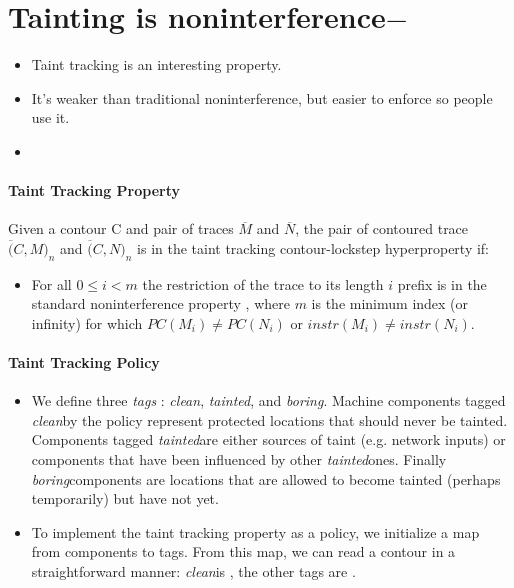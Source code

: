 \documentclass[conference]{IEEEtran}
\begin{document}
\newpage
\section{Tainting is noninterference$-$}

\begin{itemize}
\item Taint tracking is an interesting property.
\item It's weaker than traditional noninterference, but easier to enforce so people use it.
\item {}
\end{itemize}

\paragraph{Taint Tracking Property}

Given a contour C and pair of traces $\overline{M}$ and $\overline{N}$,
the pair of contoured trace $\overline(C, M)_n$ and $\overline(C,N)_n$ is in the
taint tracking contour-lockstep hyperproperty if:
\begin{itemize}
\item For all $0 \leq i < m$ the restriction of the trace to its
  length $i$ prefix is in the standard noninterference property
  , where $m$ is the minimum
  index (or infinity) for which $PC(M_i) \not = PC(N_i)$ or
  $instr(M_i) \not = instr(N_i)$.
\end{itemize}

\paragraph{Taint Tracking Policy}

\newcommand*{\clean}{{\em clean}}
\newcommand*{\tainted}{{\em tainted}}
\newcommand*{\boring}{{\em boring}}
\begin{itemize}
\item We define three {\em tags} : \clean, \tainted, and \boring. Machine components tagged
  \clean by the policy represent protected locations that should never
  be tainted. Components tagged \tainted are either sources of taint
  (e.g. network inputs) or components that have been influenced by
  other \tainted ones. Finally \boring components are locations that
  are allowed to become tainted (perhaps temporarily) but have not
  yet.
\item To implement the taint tracking property as a policy, we
  initialize a map from components to tags. From this map, we can read
  a contour in a straightforward manner: \clean is \VIS, the other
  tags are \HID.
\end{itemize}
\end{document}
